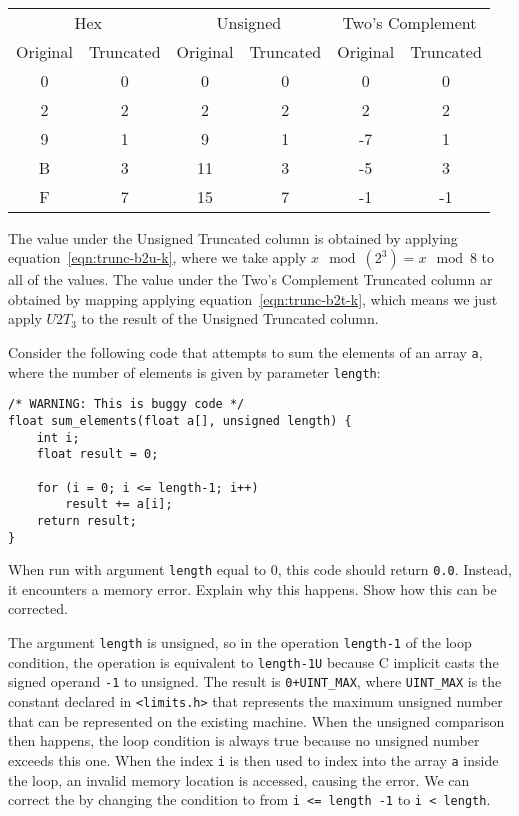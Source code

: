 \documentclass[12pt]{article}
\newenvironment{ex}[2][Exercise]{\begin{trivlist}
		\item[\hskip \labelsep {\bfseries #1}\hskip \labelsep {\bfseries #2.}]}{\end{trivlist}}
\newenvironment{sol}[1][Solution]{\begin{trivlist}
		\item[\hskip \labelsep {\bfseries #1:}]}{\end{trivlist}}
\begin{document}
\begin{sol}
	\
	\begin{center}
		\begin{tabular}{cccccc}
			\multicolumn{2}{c}{Hex} & \multicolumn{2}{c}{Unsigned} & \multicolumn{2}{c}{Two's Complement}\\
			Original & Truncated & Original & Truncated & Original & Truncated\\
			\hline
			0 & 0 & 0 & 0 & 0 & 0\\
			2 & 2 & 2 & 2 & 2 & 2\\
			9 & 1 & 9 & 1 & -7 & 1\\
			B & 3 & 11 & 3 & -5 & 3\\
			F & 7 & 15 & 7 & -1 & -1
		\end{tabular}
	\end{center}
	The value under the Unsigned  Truncated column is obtained by applying equation~\ref{eqn:trunc-b2u-k},
	where we take apply $x\mod (2^3)=x\mod8$ to all of the values. The value under the Two's Complement
	Truncated column ar obtained by mapping applying equation~\ref{eqn:trunc-b2t-k}, which means
	we just apply $U2T_3$ to the result of the Unsigned Truncated column.
\end{sol}

\begin{ex}{2.25}
	Consider the following code that attempts to sum the elements of an array \texttt{a},
	where the number of elements is given by parameter \texttt{length}:
	\begin{lstlisting}
/* WARNING: This is buggy code */
float sum_elements(float a[], unsigned length) {
	int i;
	float result = 0;
	
	for (i = 0; i <= length-1; i++)
	    result += a[i];
	return result;
}
	\end{lstlisting}
	When run with argument \texttt{length} equal to 0, this code should return \texttt{0.0}.
	Instead, it encounters a memory error. Explain why this happens. Show how this can be
	corrected.
\end{ex}

\begin{sol}
	The argument \texttt{length} is unsigned, so in the operation \texttt{length-1} of
	the loop condition, the operation is equivalent to \texttt{length-1U} because C implicit
	casts the signed operand \texttt{-1} to unsigned. The result is \texttt{0+UINT\_MAX},
	where \texttt{UINT\_MAX} is the constant declared in \texttt{<limits.h>} that represents
	the maximum unsigned number that can be represented on the existing machine.
	When the unsigned comparison then happens, the loop condition is always true because
	no unsigned number exceeds this one. When the index \texttt{i} is then used to index
	into the array \texttt{a} inside the loop, an invalid memory location is accessed,
	causing the error. We can correct the by changing the condition to from
	\texttt{i <= length -1} to \texttt{i < length}.
\end{sol}
\end{document}
